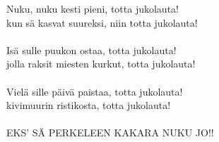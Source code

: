 
            Nuku, nuku kesti pieni, totta jukolauta! \\
            kun sä kasvat suureksi, niin totta jukolauta! \\
\hspace{10mm} \\
            Isä sulle puukon ostaa, totta jukolauta! \\
            jolla raksit miesten kurkut, totta jukolauta! \\
\hspace{10mm} \\
            Vielä sille päivä paistaa, totta jukolauta! \\
            kivimuurin ristikosta, totta jukolauta! \\
\hspace{10mm} \\
            EKS’ SÄ PERKELEEN KAKARA NUKU JO!! \\
